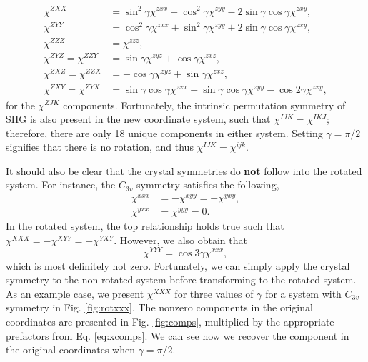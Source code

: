 \documentclass[aps,prb,10pt,letterpaper,notitlepage]{revtex4-1}
\begin{document}
\begin{equation*}
\begin{split}
\chi^{ZXX}
&=  \sin^{2}\gamma        \chi^{zxx}
 +  \cos^{2}\gamma        \chi^{zyy}
 - 2\sin\gamma \cos\gamma \chi^{zxy},\\[10pt]
\chi^{ZYY}
&=  \cos^{2}\gamma        \chi^{zxx}
 +  \sin^{2}\gamma        \chi^{zyy}
 + 2\sin\gamma \cos\gamma \chi^{zxy},\\[10pt]
\chi^{ZZZ} &=  \chi^{zzz},\\[10pt]
\chi^{ZYZ} = \chi^{ZZY}
&= \sin\gamma \chi^{zyz}
 + \cos\gamma \chi^{zxz},\\[10pt]
\chi^{ZXZ} = \chi^{ZZX}
&= 
- \cos\gamma \chi^{zyz}
+ \sin\gamma \chi^{zxz},\\[10pt]
\chi^{ZXY} = \chi^{ZYX}
&= \sin\gamma \cos\gamma \chi^{zxx}
 - \sin\gamma \cos\gamma \chi^{zyy}
 - \cos2\gamma         \chi^{zxy},
\end{split}
\end{equation*}
for the $\chi^{ZJK}$ components. Fortunately, the intrinsic permutation symmetry
of SHG is also present in the new coordinate system, such that $\chi^{IJK} =
\chi^{IKJ}$; therefore, there are only 18 unique components in either system.
Setting $\gamma = \pi/2$ signifies that there is no rotation, and thus $\chi^{IJK}
= \chi^{ijk}$.

It should also be clear that the crystal symmetries do \textbf{not} follow into
the rotated system. For instance, the $C_{3v}$ symmetry satisfies the following,
\begin{equation*}
\begin{split}
\chi^{xxx} &= -\chi^{xyy} = - \chi^{yxy},\\
\chi^{yxx} &= \chi^{yyy} = 0.
\end{split}
\end{equation*}
In the rotated system, the top relationship holds true such that $\chi^{XXX} =
-\chi^{XYY} = - \chi^{YXY}$. However, we also obtain that
\begin{equation*}
\chi^{YYY} = \cos3\gamma \chi^{xxx},
\end{equation*}
which is most definitely not zero. Fortunately, we can simply apply the crystal
symmetry to the non-rotated system before transforming to the rotated system. As
an example case, we present $\chi^{XXX}$ for three values of $\gamma$ for a
system with $C_{3v}$ symmetry in Fig. \ref{fig:rotxxx}. The nonzero components
in the original coordinates are presented in Fig. \ref{fig:comps}, multiplied by
the appropriate prefactors from Eq. \eqref{eq:xcomps}. We can see how we recover
the component in the original coordinates when $\gamma = \pi/2$.
\end{document}

